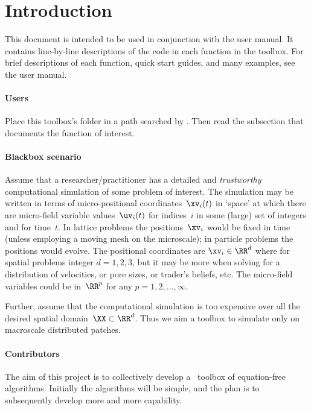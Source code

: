 \section{Introduction}
\begin{funDescription}
This document is intended to be used in conjunction with the user manual. It contains line-by-line descriptions of the code in each function in the toolbox. For brief descriptions of each function, quick start guides, and many examples, see the user manual.
\end{funDescription}

\begin{userExample}
\localtableofcontents

\paragraph{Users}
Place this toolbox's folder in a path searched by \script.
Then read the subsection that documents the function of interest.


\paragraph{Blackbox scenario}
Assume that a researcher\slash practitioner has a detailed and \emph{trustworthy} computational simulation of some problem of interest.
The simulation may be written in terms of micro-positional coordinates~\(\xv_i(t)\) in `space' at which there are micro-field variable values~\(\uv_i(t)\) for indices~\(i\) in some (large) set of integers and for time~\(t\).
In lattice problems the positions~\(\xv_i\) would be fixed in time (unless employing a moving mesh on the microscale); in particle problems the positions would evolve.
The positional coordinates are \(\xv_i\in\RR^{d}\) where for spatial problems integer \(d=1,2,3\), but it may be more when solving for a distribution of velocities, or pore sizes, or trader's beliefs, etc.
The micro-field variables could be in~\(\RR^{p}\) for any \(p=1,2,\ldots,\infty\).

Further, assume that the computational simulation is too expensive over all the desired spatial domain~\(\XX\subset\RR^{d}\).
Thus we aim a toolbox to simulate only on macroscale distributed patches.



\paragraph{Contributors}
The aim of this project is to collectively develop a \script\ toolbox of equation-free algorithms.
Initially the algorithms will be simple, and the plan is to subsequently develop more and more capability.


\end{userExample}

